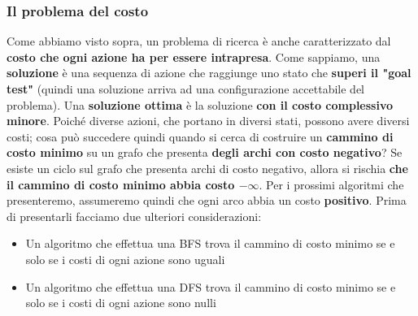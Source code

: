 \documentclass[12pt]{article}
\begin{document}
\subsubsection{Il problema del costo}
Come abbiamo visto sopra, un problema di ricerca è anche caratterizzato dal \textbf{costo che ogni azione ha per essere intrapresa}.
Come sappiamo, una \textbf{soluzione} è una sequenza di azione che raggiunge uno stato che \textbf{superi il "goal test"} (quindi una soluzione arriva ad una configurazione accettabile del problema).
Una \textbf{soluzione ottima} è la soluzione \textbf{con il costo complessivo minore}.
Poiché diverse azioni, che portano in diversi stati, possono avere diversi costi; cosa può succedere quindi quando si cerca di costruire
un \textbf{cammino di costo minimo} su un grafo che presenta \textbf{degli archi con costo negativo}?
Se esiste un ciclo sul grafo che presenta archi di costo negativo, allora si rischia \textbf{che il cammino di costo minimo abbia costo $-\infty$}.
Per i prossimi algoritmi che presenteremo, assumeremo quindi che ogni arco abbia un costo \textbf{positivo}.
Prima di presentarli facciamo due ulteriori considerazioni:
\begin{itemize}
    \item Un algoritmo che effettua una BFS trova il cammino di costo minimo se e solo se i costi di ogni azione sono uguali
    \item Un algoritmo che effettua una DFS trova il cammino di costo minimo se e solo se i costi di ogni azione sono nulli
\end{itemize}
\end{document}
